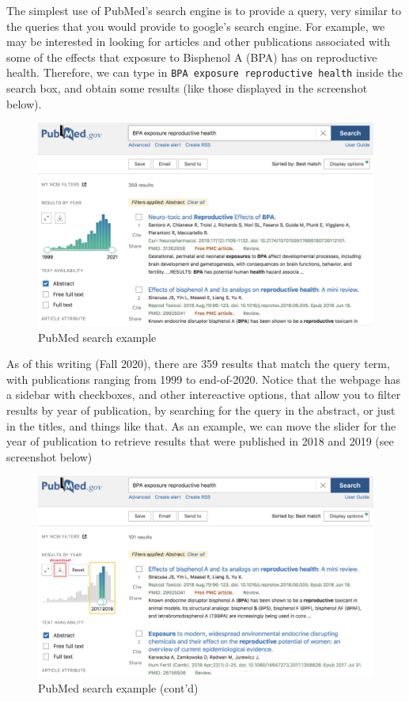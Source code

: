 \documentclass[
]{book}
\begin{document}
The simplest use of PubMed's search engine is to provide a query, very similar
to the queries that you would provide to google's search engine. For example,
we may be interested in looking for articles and other publications associated
with some of the effects that exposure to Bisphenol A (BPA) has on reproductive
health. Therefore, we can type in \texttt{BPA\ exposure\ reproductive\ health} inside the
search box, and obtain some results (like those displayed in the screenshot
below).

\begin{figure}

{\centering \includegraphics[width=0.7\linewidth]{images/api/pubmed-search1} 

}

\caption{PubMed search example}\label{fig:unnamed-chunk-131}
\end{figure}

As of this writing (Fall 2020), there are 359 results that match the query
term, with publications ranging from 1999 to end-of-2020. Notice that the
webpage has a sidebar with checkboxes, and other intereactive options, that
allow you to filter results by year of publication, by searching for the query
in the abstract, or just in the titles, and things like that. As an example,
we can move the slider for the year of publication to retrieve results that
were published in 2018 and 2019 (see screenshot below)

\begin{figure}

{\centering \includegraphics[width=0.7\linewidth]{images/api/pubmed-search2} 

}

\caption{PubMed search example (cont'd)}\label{fig:unnamed-chunk-132}
\end{figure}
\end{document}
